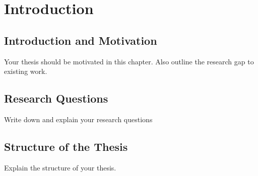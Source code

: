 \chapter{Introduction}
\label{ch:introduction}

% 


\section{Introduction and Motivation}

Your thesis should be motivated in this chapter. Also outline the research gap to existing work. 


\section{Research Questions}
	\label{sec:reserach_questions}

Write down and explain your research questions

\section{Structure of the Thesis}
\label{sec:structure_of_the_thesis}

Explain the structure of your thesis.



